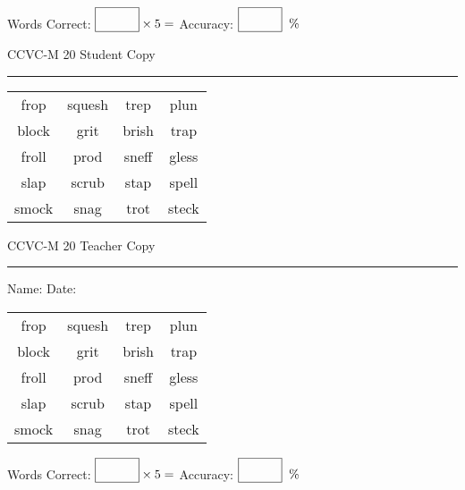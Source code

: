 \documentclass{memoir}
\begin{document}
\small

Words Correct: $\fbox{\phantom{\huge 100}} \times 5 = $ Accuracy: $\fbox{\phantom{\huge 100}}\;\; \%$ 

\vfill

\newpage



\footnotesize \noindent
CCVC-M 20 \hfill Student Copy
\smallskip
\hrule

\Large

\setlength{\tabcolsep}{14pt}
\def\arraystretch{3}

{\selectfont


\begin{vplace}[0.5]
\begin{center}
\begin{tabular}{cccc}
frop & squesh & trep & plun \\
block & grit      & brish & trap \\
froll & prod & sneff & gless \\
slap            & scrub & stap & spell \\
smock & snag & trot & steck \\
\end{tabular}
\end{center}
\end{vplace}

}

\newpage

\footnotesize \noindent
CCVC-M 20 \hfill Teacher Copy
\smallskip
\hrule

\small

\vfill

\noindent
Name: \underline{\hspace{1.75in}} \hfill Date: \underline{\hspace{1in}}

\Large

{\selectfont


\begin{vplace}[0.5]
\begin{center}
\begin{tabular}{cccc}
frop & squesh & trep & plun \\
block & grit      & brish & trap \\
froll & prod & sneff & gless \\
slap            & scrub & stap & spell \\
smock & snag & trot & steck \\
\end{tabular}
\end{center}
\end{vplace}



}

\small

Words Correct: $\fbox{\phantom{\huge 100}} \times 5 = $ Accuracy: $\fbox{\phantom{\huge 100}}\;\; \%$ 

\vfill

\end{document}
